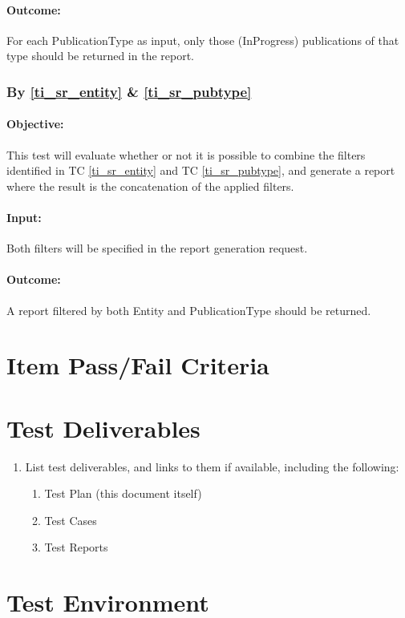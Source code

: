 \paragraph{Outcome:}
For each PublicationType as input, only those (InProgress) publications of that type should be returned in the report.

\subsubsection{By \ref{ti_sr_entity} \& \ref{ti_sr_pubtype}}
\paragraph{Objective:}
This test will evaluate whether or not it is possible to combine the filters identified in TC \ref{ti_sr_entity} and TC \ref{ti_sr_pubtype}, and generate a report where the result is the concatenation of the applied filters.
\paragraph{Input:}
Both filters will be specified in the report generation request.
\paragraph{Outcome:}
A report filtered by both Entity and PublicationType should be returned.

\section{Item Pass/Fail Criteria}
  

\section{Test Deliverables}

\begin{enumerate}
	\item List test deliverables, and links to them if available, including the following:

\begin{enumerate}
	\item Test Plan (this document itself)
	\item Test Cases 
	\item Test Reports
\end{enumerate}
\end{enumerate} 
\section{Test Environment} 

